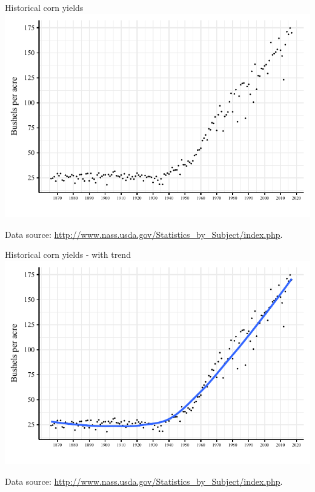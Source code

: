 \documentclass[table,xcolor=pdftex,dvipsnames, handout]{beamer}\usepackage[]{graphicx}\usepackage[]{color}
\makeatletter
\def\maxwidth{ %
  \ifdim\Gin@nat@width>\linewidth
    \linewidth
  \else
    \Gin@nat@width
  \fi
}
\newenvironment{knitrout}{}{} %
\makeatother
\begin{document}
\begin{frame}{Historical corn yields}
\begin{knitrout}
\color{fgcolor}
\includegraphics[width=\maxwidth]{figure/figure_corn_yield-1} 

\end{knitrout}
\scriptsize
Data source: \url{http://www.nass.usda.gov/Statistics_by_Subject/index.php}.
\end{frame}


\begin{frame}{Historical corn yields - with trend}
\begin{knitrout}
\color{fgcolor}
\includegraphics[width=\maxwidth]{figure/figure_corn_yield2-1} 

\end{knitrout}
\scriptsize
Data source: \url{http://www.nass.usda.gov/Statistics_by_Subject/index.php}.
\end{frame}
\end{document}
